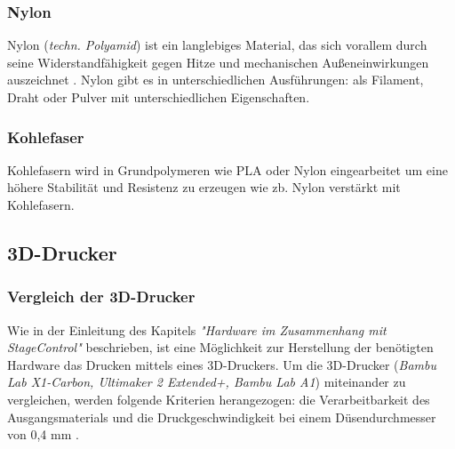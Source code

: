 \subsubsection{Nylon}
Nylon (\textit{techn. Polyamid}) ist ein langlebiges Material, das sich vorallem durch seine Widerstandfähigkeit gegen Hitze und mechanischen Außeneinwirkungen auszeichnet \parencite{Nylon}. Nylon gibt es in unterschiedlichen Ausführungen: als Filament, Draht oder Pulver mit unterschiedlichen Eigenschaften. 

\subsubsection{Kohlefaser}
Kohlefasern wird in Grundpolymeren wie PLA oder Nylon eingearbeitet \parencite{Kohlefasern} um eine höhere Stabilität und Resistenz zu erzeugen wie zb. Nylon verstärkt mit Kohlefasern.\\



\subsection{3D-Drucker}

\subsubsection{Vergleich der 3D-Drucker}
Wie in der Einleitung des Kapitels \textit{"Hardware im Zusammenhang mit StageControl"} beschrieben, ist eine Möglichkeit zur Herstellung der benötigten Hardware das Drucken mittels eines 3D-Druckers. Um die 3D-Drucker (\textit{Bambu Lab X1-Carbon, Ultimaker 2 Extended+, Bambu Lab A1})  \parencite{Ultimaker2ExtendedSpecification} \parencite{BambuLabA1} miteinander zu vergleichen, werden folgende Kriterien herangezogen: die Verarbeitbarkeit des Ausgangsmaterials und die Druckgeschwindigkeit bei einem Düsendurchmesser von 0,4 mm \parencite{BambuLabX1Carbon3DPrinterSpecifications}. 

